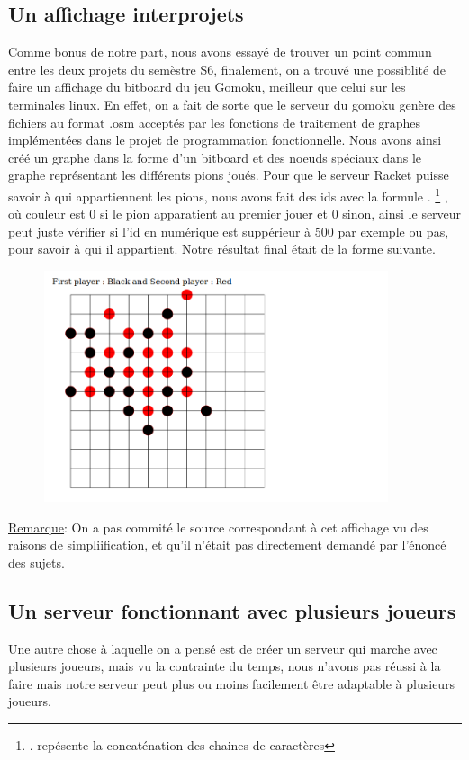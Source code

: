 \documentclass[french]{article}
\begin{document}
\subsection{Un affichage interprojets}
Comme bonus de notre part, nous avons essayé de trouver un point commun entre les deux projets du semèstre S6, finalement, on a trouvé une possiblité de faire un affichage du bitboard du jeu Gomoku, meilleur que celui sur les terminales linux. En effet, on a fait de sorte que le serveur du gomoku genère des fichiers au format .osm acceptés par les fonctions de traitement de graphes implémentées dans le projet de programmation fonctionnelle. Nous avons ainsi créé un graphe dans la forme d'un bitboard et des noeuds spéciaux dans le graphe représentant les différents pions joués. Pour que le serveur Racket puisse savoir à qui appartiennent les pions, nous avons fait des ids avec la formule 
 . \footnote{. repésente la concaténation des chaines de caract\`eres}
, o\`u couleur est 0 si le pion apparatient au premier jouer et 0 sinon, ainsi le serveur peut juste vérifier si l'id en numérique est suppérieur à 500 par exemple ou pas, pour savoir à qui il appartient.
Notre résultat final était de la forme suivante.
\begin{figure}[ht!]
    \centering
    \includegraphics[width=0.90\textwidth]{display.png}
    \caption{}
    \label{fig:display}
\end{figure}
\underline{Remarque}: On a pas commité le source correspondant à cet affichage vu des raisons de simpliification, et qu'il n'était pas directement demandé par l'énoncé des sujets.
\subsection{Un serveur fonctionnant avec plusieurs joueurs}
Une autre chose à laquelle on a pensé est de créer un serveur qui marche avec plusieurs joueurs, mais vu la contrainte du temps, nous n'avons pas réussi à la faire mais notre serveur peut plus ou moins facilement être adaptable à plusieurs joueurs.
\end{document}
